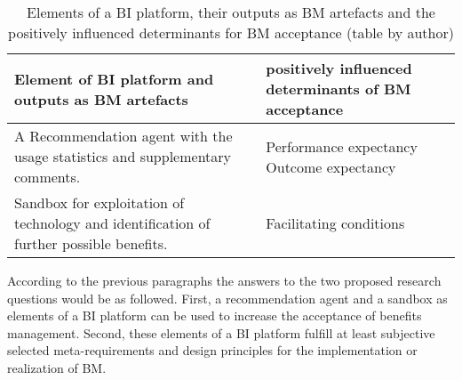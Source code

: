 \begin{table}[H]
  \begin{tabular}{|p{7cm}|p{7cm}|}
 \hline
\textbf{Element of BI platform and outputs as BM artefacts} & \textbf{positively influenced determinants of BM acceptance}\\
\hline  
A Recommendation agent with the usage statistics and supplementary comments.
&
Performance expectancy\newline
Outcome expectancy
\\
\hline
Sandbox for exploitation of technology and identification of further possible benefits.
&
Facilitating conditions
\newline
\\
\hline

  \end{tabular}
   \caption{Elements of a BI platform, their outputs as BM artefacts and the positively influenced determinants for BM acceptance (table by author)}
	\label{elements_bi_acceptance}
\end{table}

According to the previous paragraphs the answers to the two proposed research questions would be as followed. First, a recommendation agent and a sandbox as elements of a BI platform can be used to increase the acceptance of benefits management. Second, these elements of a BI platform fulfill at least subjective selected meta-requirements and design principles for the implementation or realization of BM.

